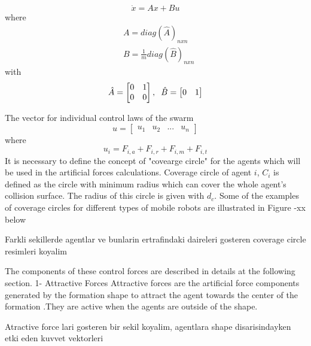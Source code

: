 \documentclass[twoside]{article}
\begin{document}
			\begin{equation}
\dot{x} = Ax + Bu
			\end{equation}
			where
			\begin{align*}
&A = diag\left(\hat{A}\right)_{nxn}\\
&B = \frac{1}{m} diag\left(\hat{B}\right)_{nxn}
			\end{align*}
			with
			\begin{equation}
\hat{A} = \begin{bmatrix}
0&1\\0&0
\end{bmatrix} , \hspace{0.2cm} \hat{B} = \begin{bmatrix}
0&1
\end{bmatrix}
			\end{equation}
			
			The vector for individual control laws of the swarm
			\begin{equation}
u = \begin{bmatrix}
u_1 & u_2 & ... & u_n
\end{bmatrix}
			\end{equation}
			where
			\begin{equation}
u_i = F_{i,a} + F_{i,r} + F_{i,m} + F_{i,t}
			\end{equation}
		It is necessary to define the concept of "covearge circle"	for the agents which will be used in the artificial forces calculations. Coverage circle of agent $i$, $C_i$ is defined as the circle with minimum radius which can cover the whole agent's collision surface. The radius of this circle is given with $d_c$. Some of the examples of coverage circles for different types of mobile robots are illustrated in Figure -xx below
		
		Farkli sekillerde agentlar ve bunlarin ertrafindaki daireleri gosteren coverage circle resimleri koyalim
		
		
		The components of these  control forces are described in details at the following section.
			1- Attractive Forces
			Attractive forces are the artificial force components generated by the formation shape to attract the agent towards the center of the formation .They are active when the agents are outside of the shape. 
			
			Atractive force lari gosteren bir sekil koyalim, agentlara shape disarisindayken etki eden kuvvet vektorleri
\end{document}
